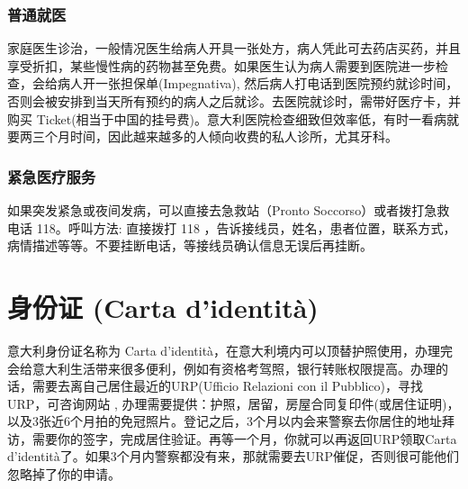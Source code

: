 \subsubsection{普通就医}
家庭医生诊治，一般情况医生给病人开具一张处方，病人凭此可去药店买药，并且享受折扣，某些慢性病的药物甚至免费。如果医生认为病人需要到医院进一步检查，会给病人开一张担保单(Impegnativa), 然后病人打电话到医院预约就诊时间，否则会被安排到当天所有预约的病人之后就诊。去医院就诊时，需带好医疗卡，并购买 Ticket(相当于中国的挂号费)。意大利医院检查细致但效率低，有时一看病就要两三个月时间，因此越来越多的人倾向收费的私人诊所，尤其牙科。

\subsubsection{紧急医疗服务}

如果突发紧急或夜间发病，可以直接去急救站（Pronto Soccorso）或者拨打急救电话 118。呼叫方法: 直接拨打 118 ，告诉接线员，姓名，患者位置，联系方式，病情描述等等。不要挂断电话，等接线员确认信息无误后再挂断。

\section{身份证 (Carta d'identità)}
意大利身份证名称为 Carta d'identità，在意大利境内可以顶替护照使用，办理完会给意大利生活带来很多便利，例如有资格考驾照，银行转账权限提高。办理的话，需要去离自己居住最近的URP(Ufficio Relazioni con il Pubblico)，寻找URP，可咨询网站 \cite{cid}, 办理需要提供：护照，居留，房屋合同复印件(或居住证明)，以及3张近6个月拍的免冠照片。登记之后，3个月以内会来警察去你居住的地址拜访，需要你的签字，完成居住验证。再等一个月，你就可以再返回URP领取Carta d'identità了。如果3个月内警察都没有来，那就需要去URP催促，否则很可能他们忽略掉了你的申请。
